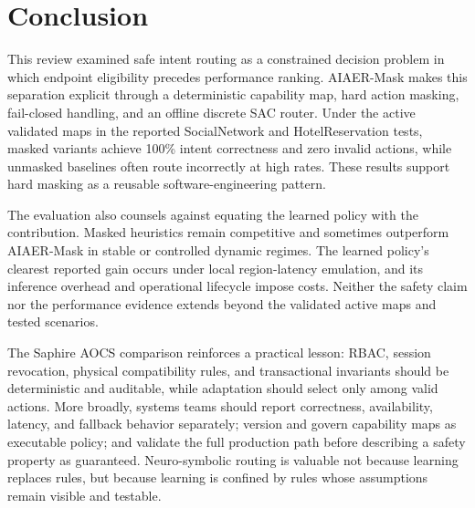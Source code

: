 \documentclass[conference]{IEEEtran}
\begin{document}
\section{Conclusion}
This review examined safe intent routing as a constrained decision problem in which endpoint eligibility precedes performance ranking. AIAER-Mask makes this separation explicit through a deterministic capability map, hard action masking, fail-closed handling, and an offline discrete SAC router. Under the active validated maps in the reported SocialNetwork and HotelReservation tests, masked variants achieve 100\% intent correctness and zero invalid actions, while unmasked baselines often route incorrectly at high rates. These results support hard masking as a reusable software-engineering pattern.

The evaluation also counsels against equating the learned policy with the contribution. Masked heuristics remain competitive and sometimes outperform AIAER-Mask in stable or controlled dynamic regimes. The learned policy's clearest reported gain occurs under local region-latency emulation, and its inference overhead and operational lifecycle impose costs. Neither the safety claim nor the performance evidence extends beyond the validated active maps and tested scenarios.

The Saphire AOCS comparison reinforces a practical lesson: RBAC, session revocation, physical compatibility rules, and transactional invariants should be deterministic and auditable, while adaptation should select only among valid actions. More broadly, systems teams should report correctness, availability, latency, and fallback behavior separately; version and govern capability maps as executable policy; and validate the full production path before describing a safety property as guaranteed. Neuro-symbolic routing is valuable not because learning replaces rules, but because learning is confined by rules whose assumptions remain visible and testable.
\end{document}

